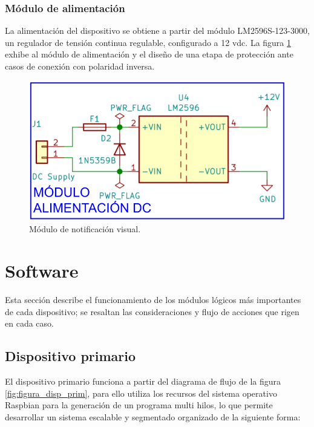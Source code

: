 \subsubsection{Módulo de alimentación}

La alimentación del dispositivo se obtiene a partir del módulo LM2596S-123-3000, un regulador de tensión continua regulable, configurado a 12 vdc. La figura \ref{fig:figura_l3} exhibe al módulo de alimentación y el diseño de una etapa de protección ante casos de conexión con polaridad inversa.

\begin{figure}[]
	\centering
	\includegraphics[scale=.3]{./Figures/Capitulo3/Fig_L3.png}
	\caption{Módulo de notificación visual.}
	\label{fig:figura_l3}
\end{figure} 


\section{Software}

Esta sección describe  el funcionamiento de los módulos lógicos más importantes de cada dispositivo; se resaltan las consideraciones y flujo de acciones que rigen en cada caso.

\subsection{Dispositivo primario}

El dispositivo primario funciona a partir del diagrama de flujo de la figura \ref{fig:figura_disp_prim}, para ello utiliza los recursos del sistema operativo Raspbian para la generación de un programa multi hilos, lo que permite desarrollar un sistema escalable y segmentado organizado de la siguiente forma: 

